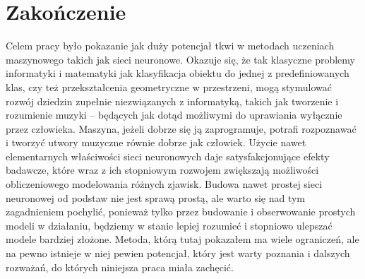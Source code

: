 \chapter*{Zakończenie}
\noindent Celem pracy było pokazanie jak duży potencjał tkwi w metodach uczeniach maszynowego takich jak sieci neuronowe. Okazuje się, że tak klasyczne problemy informatyki i matematyki jak klasyfikacja obiektu do jednej z predefiniowanych klas, czy też przekształcenia geometryczne w przestrzeni, mogą stymulować rozwój dziedzin zupełnie niezwiązanych z informatyką, takich jak tworzenie i rozumienie muzyki -- będących jak dotąd możliwymi do uprawiania wyłącznie przez człowieka. Maszyna, jeżeli dobrze się ją zaprogramuje, potrafi rozpoznawać i tworzyć utwory muzyczne równie dobrze jak człowiek. Użycie nawet elementarnych właściwości sieci neuronowych daje satysfakcjonujące efekty badawcze, które wraz z ich stopniowym rozwojem zwiększają możliwości obliczeniowego modelowania różnych zjawisk. Budowa nawet prostej sieci neuronowej od podstaw nie jest sprawą prostą, ale warto się nad tym zagadnieniem pochylić, ponieważ tylko przez budowanie i obserwowanie prostych modeli w działaniu, będziemy w stanie lepiej rozumieć i stopniowo ulepszać modele bardziej złożone.
Metoda, którą tutaj pokazałem ma wiele ograniczeń, ale na pewno istnieje w niej pewien potencjał, który jest warty poznania i dalszych rozważań, do których niniejsza praca miała zachęcić.